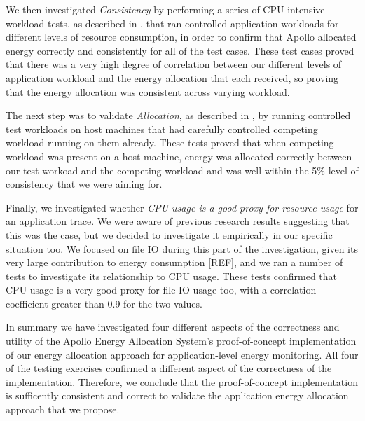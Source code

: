 We then investigated \textit{Consistency} by performing a series of CPU intensive workload tests, as described in , that ran controlled application workloads for different levels of resource consumption, in order to confirm that Apollo allocated energy correctly and consistently for all of the test cases.  These test cases proved that there was a very high degree of correlation between our different levels of application workload and the energy allocation that each received, so proving that the energy allocation was consistent across varying workload.

The next step was to validate \textit{Allocation}, as described in , by running controlled test workloads on host machines that had carefully controlled competing workload running on them already. These tests proved that when competing workload was present on a host machine, energy was allocated correctly between our test workoad and the competing workload and was well within the 5\% level of consistency that we were aiming for.

Finally, we investigated whether \textit{CPU usage is a good proxy for resource usage} for an application trace.  We were aware of previous research results suggesting that this was the case, but we decided to investigate it empirically in our specific situation too.  We focused on file IO during this part of the investigation, given its very large contribution to energy consumption [REF], and we ran a number of tests to investigate its relationship to CPU usage.  These tests confirmed that CPU usage is a very good proxy for file IO usage too, with a correlation coefficient greater than 0.9 for the two values.

In summary we have investigated four different aspects of the correctness and utility of the Apollo Energy Allocation System's proof-of-concept implementation of our energy allocation approach for application-level energy monitoring.  All four of the testing exercises confirmed a different aspect of the correctness of the implementation.  Therefore, we conclude that the proof-of-concept implementation is sufficently consistent and correct to validate the application energy allocation approach that we propose.

